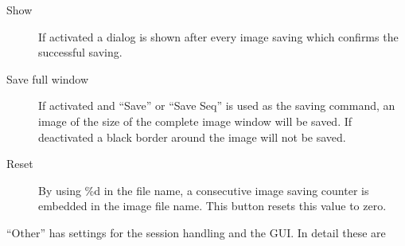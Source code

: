 \begin{description}
\item[Show ] If activated a dialog is shown after
  every image saving which confirms the successful saving.

\item[Save full window] If activated and ``Save'' or ``Save Seq'' is
  used as the saving command, an image of the size of the complete
  image window will be saved. If deactivated a black border around
  the image will not be saved.

\item[Reset ] By using \%d in the file name, a
  consecutive image saving counter is embedded in the image file
  name. This button resets this value to zero.
\end{description}

``Other'' has settings for the session handling and the GUI. In
detail these are

